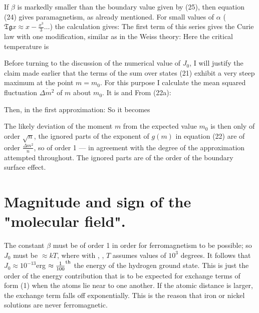 \begin{paper}{1}
If $\beta$ is markedly smaller than the boundary value given by (25), then equation (24) gives paramagnetism, as already mentioned. For small values of $\alpha$ ($\mathfrak{Tg} x \approx x - \frac{x^3}{3}\dots$) the calculation gives:
The first term of this series gives the Curie law with one modification, similar as in the Weiss theory:
Here the critical temperature is

Before turning to the discussion of the numerical value of $J_0$, I will justify the claim made earlier that the terms of the sum over states (21) exhibit a very steep maximum at the point $m=m_0$. For this purpose I calculate the mean squared fluctuation $\overline{\Delta m^2}$ of $m$ about $m_0$. It is
and
From (22a):

Then, in the first approximation:
So it becomes

The likely deviation of the moment $m$ from the expected value $m_0$ is then only of order $\sqrt{n}$, the ignored parts of the exponent of $g(m)$ in equation (22) are of order $\frac{\Delta m^2}{n}$, so of order 1 — in agreement with the degree of the approximation attempted throughout. The ignored parts are of the order of the boundary surface effect.

\section{Magnitude and sign of the "molecular field".} The constant $\beta$ must be of order 1 in order for ferromagnetism to be possible; so $J_0$ must be $\approx kT$, where with , ,  $T$ assumes values of $10^3$ degrees. It follows that $J_0 \approx 10^{-13}$\unit{erg} $\approx {\frac{1}{100}}^\text{th}$ the energy of the hydrogen ground state. This is just the order of the energy contribution that is to be expected for exchange terms of form (1) when the atoms lie near to one another. If the atomic distance is larger, the exchange term falls off exponentially. This is the reason that iron or nickel solutions are never ferromagnetic.


\end{paper}
